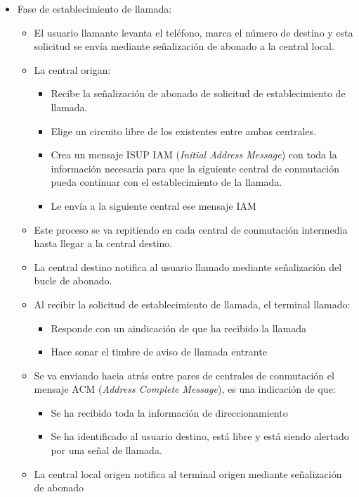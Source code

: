 \documentclass[10pt,portrait, twocolumn]{article}
\begin{document}
	
	\begin{itemize}
	\item Fase de establecimiento de llamada:
		\begin{itemize}
		\item El usuario llamante levanta el teléfono, marca el número de destino y esta solicitud se envía mediante señalización de abonado a la central local.
		\item La central origan:
			\begin{itemize}
			\item Recibe la señalización de abonado de solicitud de establecimiento de llamada.
			\item Elige un circuito libre de los existentes entre ambas centrales.
			\item Crea un mensaje ISUP IAM (\textit{Initial Address Message}) con toda la información necesaria para que la siguiente central de conmutación pueda continuar con el establecimiento de la llamada.
			\item Le envía a la siguiente central ese mensaje IAM
			\end{itemize}
		\item Este proceso se va repitiendo en cada central de conmutación intermedia hasta llegar a la central destino.
		\item La central destino notifica al usuario llamado mediante señalización del bucle de abonado.
		\item Al recibir la solicitud de establecimiento de llamada, el terminal llamado:
			\begin{itemize}
			\item Responde con un aindicación de que ha recibido la llamada
			\item Hace sonar el timbre de aviso de llamada entrante
			\end{itemize}
		\item Se va enviando hacia atrás entre pares de centrales de conmutación el mensaje ACM (\textit{Address Complete Message}), es una indicación de que:
			\begin{itemize}
			\item Se ha recibido toda la información de direccionamiento
			\item Se ha identificado al usuario destino, está libre y está siendo alertado por una señal de llamada.
			\end{itemize}
			\item La central local origen notifica al terminal origen mediante señalización de abonado
				\begin{itemize}

\end{itemize}
\end{itemize}
\end{itemize}
\end{document}
